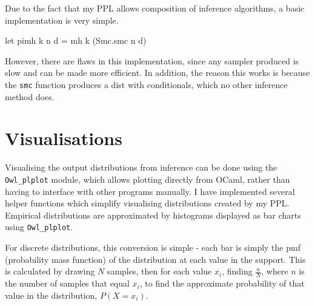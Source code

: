 
Due to the fact that my PPL allows composition of inference algorithms, a basic implementation is very simple.

\begin{ocamlcode-in}
let pimh k n d = mh k (Smc.smc n d)
\end{ocamlcode-in}
However, there are flaws in this implementation, since any sampler produced is slow and can be made more efficient.
In addition, the reason this works is because the \texttt{smc} function produces a dist with conditionals, which no other inference method does.

\section{Visualisations}
Visualising the output distributions from inference can be done using the \texttt{Owl\_plplot} module, which allows plotting directly from OCaml, rather than having to interface with other programs manually. I have implemented several helper functions which simplify visualising distributions created by my PPL. Empirical distributions are approximated by histograms displayed as bar charts using \texttt{Owl\_plplot}.

For discrete distributions, this conversion is simple - each bar is simply the pmf (probability mass function) of the distribution at each value in the support. This is calculated by drawing $N$ samples, then for each value $x_i$, finding $\frac{n}{N}$, where $n$ is the number of samples that equal $x_i$, to find the approximate probability of that value in the distribution, $P(X = x_i)$.

